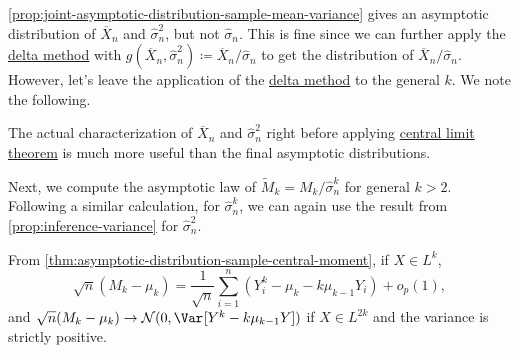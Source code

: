\autoref{prop:joint-asymptotic-distribution-sample-mean-variance} gives an asymptotic distribution of \(\overline{X} _n\) and \(\hat{\sigma} _n^2\), but not \(\hat{\sigma} _n\). This is fine since we can further apply the \hyperref[thm:delta-method]{delta method} with \(g(\overline{X} _n , \hat{\sigma} _ n^2) \coloneqq \overline{X} _n / \hat{\sigma} _n\) to get the distribution of \(\overline{X} _n / \hat{\sigma} _n\). However, let's leave the application of the \hyperref[thm:delta-method]{delta method} to the general \(k\). We note the following.

\begin{note}
	The actual characterization of \(\overline{X} _n\) and \(\hat{\sigma} _n^2\) right before applying \hyperref[thm:CLT]{central limit theorem} is much more useful than the final asymptotic distributions.
\end{note}

Next, we compute the asymptotic law of \(\widetilde{M} _k = M_k / \hat{\sigma} _n^k\) for general \(k > 2\). Following a similar calculation, for \(\hat{\sigma} _n^k\), we can again use the result from \autoref{prop:inference-variance} for \(\hat{\sigma} _n^2\).

\begin{prev}
	From \autoref{thm:asymptotic-distribution-sample-central-moment}, if \(X \in L^{k}\),
	\[
		\sqrt{n} (M_k - \mu _k)
		= \frac{1}{\sqrt{n} } \sum_{i=1}^{n} (Y_i^k - \mu _k - k \mu _{k-1} Y_i) + o_p(1),
	\]
	and \(\sqrt{n} (M_k - \mu _k) \to \mathcal{N} (0, \Var_{}[Y^k - k \mu _{k-1} Y] )\) if \(X \in L^{2k}\) and the variance is strictly positive.
\end{prev}

